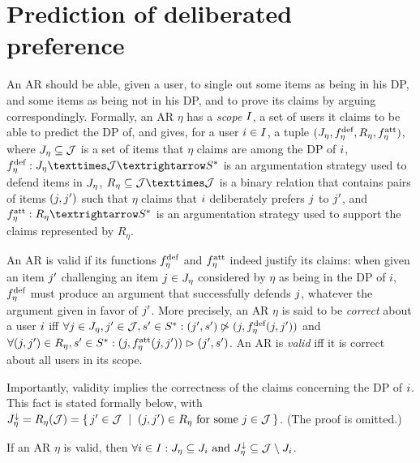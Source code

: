 \documentclass[french, english]{da2pl2018}
\begin{document}
\section{Prediction of deliberated preference}
\label{sec:pred}
An \ac{AR} should be able, given a user, to single out some items as being in his \ac{DP}, and some items as being not in his \ac{DP}, and to prove its claims by arguing correspondingly. 
Formally, an \ac{AR} $\eta$ has a \emph{scope} $I$, a set of users it claims to be able to predict the \ac{DP} of, and gives, for a user $i \in I$, a tuple $(J_{\eta}, f^\text{def}_{\eta}, R_\eta, f^\text{att}_{\eta})$, where $J_{\eta} \subseteq \mathcal{J}$ is a set of items that $\eta$ claims are among the \ac{DP} of $i$, $\mdef: \mitems × \allitems → \allargs$ is an argumentation strategy used to defend items in $J_{\eta}$, $R_\eta \subseteq \allitems × \allitems$ is a binary relation that contains pairs of items $(j, j')$ such that $\eta$ claims that $i$ deliberately prefers $j$ to $j'$, and $\matt: R_\eta → \allargs$ is an argumentation strategy used to support the claims represented by $R_\eta$.

An \ac{AR} is valid if its functions $f^\text{def}_{\eta}$ and $f^\text{att}_{\eta}$ indeed justify its claims: when given an item $j'$ challenging an item $j \in J_{\eta}$ considered by $\eta$ as being in the \ac{DP} of $i$, $f^\text{def}_{\eta}$ must produce an argument that successfully defends $j$, whatever the argument given in favor of $j'$. More precisely, an \ac{AR} $\eta$ is said to be \emph{correct} about a user $i$ iff $\forall j \in J_{\eta}, j' \in \mathcal{J}, s' \in S^*: (j', s') \not\vartriangleright (j, f^\text{def}_{\eta}(j, j'))$ and $\forall (j, j') \in R_\eta, s' \in S^*: (j, f^\text{att}_{\eta}(j, j')) \vartriangleright (j', s')$. An \ac{AR} is \emph{valid} iff it is correct about all users in its scope.

Importantly, validity implies the correctness of the claims concerning the \ac{DP} of $i$. This fact is stated formally below, with $\mnitems = R_\eta(\allitems) = \set{\itm' \in \allitems \suchthat (\itm, \itm') \in R_\eta \text{ for some } \itm \in \allitems}$. (The proof is omitted.)
\begin{fact}
	If an \ac{AR} $\eta$ is valid, then $\forall i \in I: J_{\eta} \subseteq J_i \text{ and } J^\downarrow_{\eta} \subseteq \mathcal{J} \setminus J_i$.
\end{fact}
\end{document}
